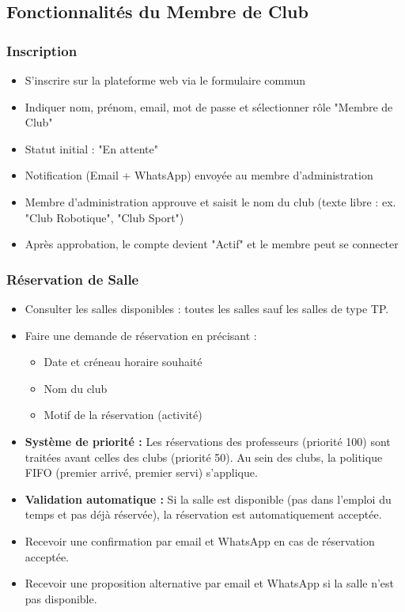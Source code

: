 \documentclass[12pt,a4paper]{article}
\begin{document}
\subsection{Fonctionnalités du Membre de Club}

\subsubsection{Inscription}
\begin{itemize}
    \item S'inscrire sur la plateforme web via le formulaire commun
    \item Indiquer nom, prénom, email, mot de passe et sélectionner rôle "Membre de Club"
    \item Statut initial : "En attente"
    \item Notification (Email + WhatsApp) envoyée au membre d'administration
    \item Membre d'administration approuve et saisit le nom du club (texte libre : ex. "Club Robotique", "Club Sport")
    \item Après approbation, le compte devient "Actif" et le membre peut se connecter
\end{itemize}

\subsubsection{Réservation de Salle}
\begin{itemize}
    \item Consulter les salles disponibles : toutes les salles sauf les salles de type TP.
    \item Faire une demande de réservation en précisant :
    \begin{itemize}
        \item Date et créneau horaire souhaité
        \item Nom du club
        \item Motif de la réservation (activité)
    \end{itemize}
    \item \textbf{Système de priorité :} Les réservations des professeurs (priorité 100) sont traitées avant celles des clubs (priorité 50). Au sein des clubs, la politique FIFO (premier arrivé, premier servi) s'applique.
    \item \textbf{Validation automatique :} Si la salle est disponible (pas dans l'emploi du temps et pas déjà réservée), la réservation est automatiquement acceptée.
    \item Recevoir une confirmation par email et WhatsApp en cas de réservation acceptée.
    \item Recevoir une proposition alternative par email et WhatsApp si la salle n'est pas disponible.
\end{itemize}
\end{document}
